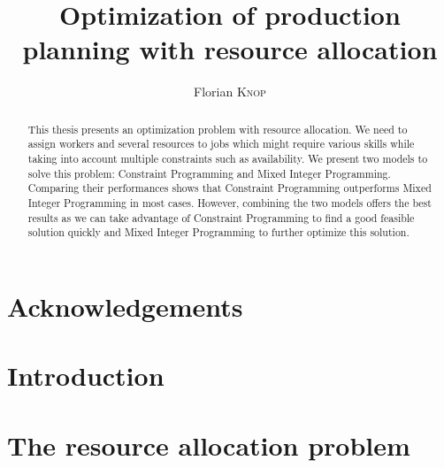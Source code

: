 \documentclass{template/EPL-master-thesis-covers-EN}
\title{Optimization of production planning with resource allocation}
\author{Florian \textsc{Knop}}
\begin{document}
  \def\chapterautorefname{Chapter}
  \def\sectionautorefname{Section}
  \def\subsectionautorefname{Subsection}
  \newcommand*{\Appendixautorefname}{Appendix}
  \newcommand{\vone}{Village n\textsuperscript{o}1}

  
  \maketitle






  \begin{abstract}
    \normalsize
    This thesis presents an optimization problem with resource allocation. 
    We need to assign workers and several resources to jobs which might require various skills while 
    taking into account multiple constraints such as availability.
    We present two models to solve this problem: Constraint Programming and Mixed Integer Programming.
    Comparing their performances shows that Constraint Programming outperforms Mixed Integer Programming in 
    most cases. However, combining the two models offers the best results as we can take advantage 
    of Constraint Programming to find a good feasible solution quickly and Mixed Integer Programming to further optimize this solution.
  \end{abstract}


  \chapter*{Acknowledgements}

  
  
  \tableofcontents


  \listoffigures

  \listoftables




  \chapter{Introduction}
  \label{chapter:introduction}
  


  \chapter{The resource allocation problem}
  \label{chapter:problem}
  
\end{document}
